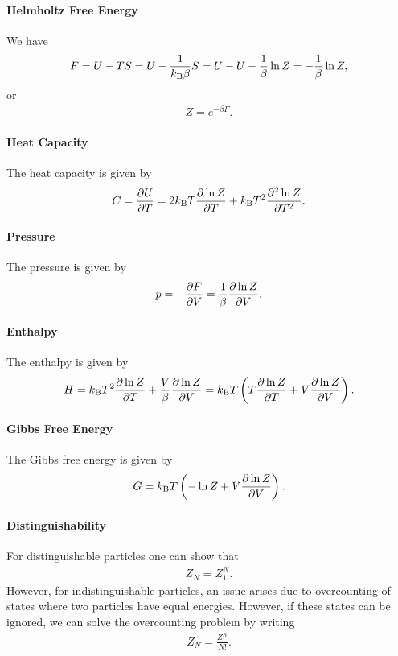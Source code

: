 \paragraph{Helmholtz Free Energy}
We have
\begin{align*}
	F = U - TS = U - \frac{1}{k_{\text{B}}\beta}S = U - U - \frac{1}{\beta}\ln{Z} = -\frac{1}{\beta}\ln{Z},
\end{align*}
or
\begin{align*}
	Z = e^{-\beta F}.
\end{align*}

\paragraph{Heat Capacity}
The heat capacity is given by
\begin{align*}
	C = \pdv{U}{T} = 2k_{\text{B}} T\pdv{\ln{Z}}{T} + k_{\text{B}} T^{2}\pdv[2]{\ln{Z}}{T}.
\end{align*}

\paragraph{Pressure}
The pressure is given by
\begin{align*}
	p = -\pdv{F}{V} = \frac{1}{\beta}\pdv{\ln{Z}}{V}.
\end{align*}

\paragraph{Enthalpy}
The enthalpy is given by
\begin{align*}
	H = k_{\text{B}} T^{2}\pdv{\ln{Z}}{T} + \frac{V}{\beta}\pdv{\ln{Z}}{V} = k_{\text{B}} T\left(T\pdv{\ln{Z}}{T} + V\pdv{\ln{Z}}{V}\right).
\end{align*}

\paragraph{Gibbs Free Energy}
The Gibbs free energy is given by
\begin{align*}
	G = k_{\text{B}} T\left(-\ln{Z} + V\pdv{\ln{Z}}{V}\right).
\end{align*}

\paragraph{Distinguishability}
For distinguishable particles one can show that
\begin{align*}
	Z_{N} = Z_{1}^{N}.
\end{align*}
However, for indistinguishable particles, an issue arises due to overcounting of states where two particles have equal energies. However, if these states can be ignored, we can solve the overcounting problem by writing
\begin{align*}
	Z_{N} = \frac{Z_{1}^{N}}{N!}.
\end{align*}

